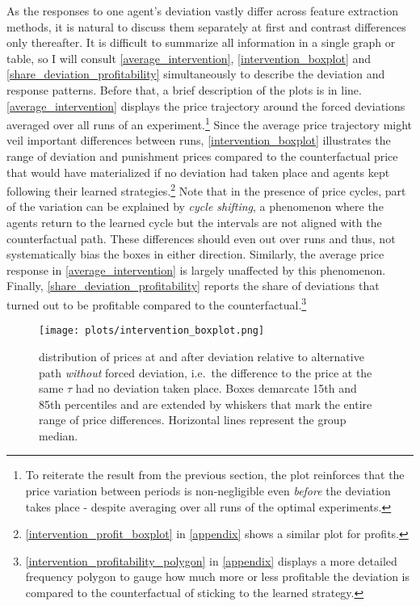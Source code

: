 As the responses to one agent's deviation vastly differ across feature extraction methods, it is natural to discuss them separately at first and contrast differences only thereafter.  It is difficult to summarize all information in a single graph or table, so I will consult \autoref{average_intervention}, \autoref{intervention_boxplot} and \autoref{share_deviation_profitability} simultaneously to describe the deviation and response patterns. Before that, a brief description of the plots is in line. \autoref{average_intervention} displays the price trajectory around the forced deviations averaged over all runs of an experiment.\footnote{To reiterate the result from the previous section, the plot reinforces that the price variation between periods is non-negligible even \emph{before} the deviation takes place - despite averaging over all runs of the optimal experiments.}  Since the average price trajectory might veil important differences between runs, \autoref{intervention_boxplot} illustrates the range of deviation and punishment prices compared to the counterfactual price that would have materialized if no deviation had taken place and agents kept following their learned strategies.\footnote{\autoref{intervention_profit_boxplot} in \autoref{appendix} shows a similar plot for profits.} Note that in the presence of price cycles, part of the variation can be explained by \emph{cycle shifting}, a phenomenon where the agents return to the learned cycle but the intervals are not aligned with the counterfactual path. These differences should even out over runs and thus, not systematically bias the boxes in either direction. Similarly, the average price response in \autoref{average_intervention} is largely unaffected by this phenomenon. Finally, \autoref{share_deviation_profitability} reports the share of deviations that turned out to be profitable compared to the counterfactual.\footnote{\autoref{intervention_profitability_polygon} in \autoref{appendix} displays a more detailed frequency polygon to gauge how much more or less profitable the deviation is compared to the counterfactual of sticking to the learned strategy.}

\begin{figure}
	\texttt{[image: plots/intervention\_boxplot.png]}
	\caption{distribution of prices at and after deviation relative to alternative path \emph{without} forced deviation, i.e.\ the difference to the price at the same $\tau$ had no deviation taken place. Boxes demarcate 15th and 85th percentiles and are extended by whiskers that mark the entire range of price differences. Horizontal lines represent the group median.}
	\label{intervention_boxplot}
\end{figure}

